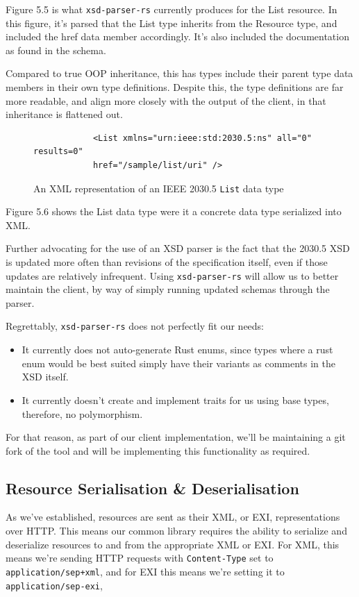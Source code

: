 Figure 5.5 is what \texttt{xsd-parser-rs} currently produces for the List resource. In this figure, it's parsed that the List type inherits from the Resource type, and included the href data member accordingly. It's also included the documentation as found in the schema.

Compared to true OOP inheritance, this has types include their parent type data members in their own type definitions.
Despite this, the type definitions are far more readable, and align more closely with the output of the client, in that inheritance is flattened out.


\begin{figure}[H]
    \begin{center}
        \begin{lstlisting}
            <List xmlns="urn:ieee:std:2030.5:ns" all="0" results=0" 
            href="/sample/list/uri" />
        \end{lstlisting}
        \label{fig:listxml}
        \caption{An XML representation of an IEEE 2030.5 \texttt{List} data type}
    \end{center}
\end{figure}

Figure 5.6 shows the List data type were it a concrete data type serialized into XML.

Further advocating for the use of an XSD parser is the fact that the 2030.5 XSD is updated more often than revisions of the specification itself, even if those updates are relatively infrequent.
Using \texttt{xsd-parser-rs} will allow us to better maintain the client, by way of simply running updated schemas through the parser.

Regrettably, \texttt{xsd-parser-rs} does not perfectly fit our needs:
\begin{itemize}
    \item It currently does not auto-generate Rust enums, since types where a rust enum would be best suited simply have their variants as comments in the XSD itself.
    \item It currently doesn't create and implement traits for us using base types, therefore, no polymorphism.
\end{itemize}

For that reason, as part of our client implementation, we'll be maintaining a git fork of the tool and will be implementing this functionality as required.


\subsection{Resource Serialisation \& Deserialisation}
As we've established, resources are sent as their XML, or EXI, representations over HTTP. This means our common library requires the ability to serialize and deserialize resources to and from the appropriate XML or EXI.
For XML, this means we're sending HTTP requests with \texttt{Content-Type} set to \texttt{application/sep+xml}, and for EXI this means we're setting it to \texttt{application/sep-exi},

